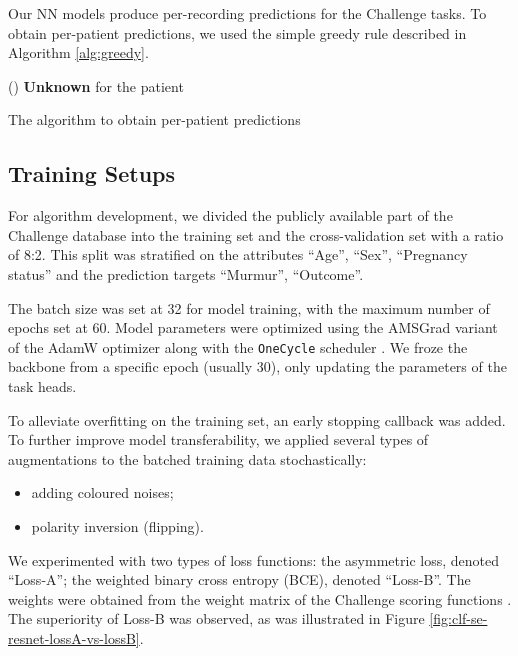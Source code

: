 Our NN models produce per-recording predictions for the Challenge tasks. To obtain per-patient predictions, we used the simple greedy rule described in Algorithm \ref{alg:greedy}.

\begin{algorithm}
\SetInd{0.2em}{2em}
\Else(){
    \textbf{Unknown} for the patient\;
}
\caption{The algorithm to obtain per-patient predictions}\label{alg:greedy}
\end{algorithm}

\subsection{Training Setups}
\label{subsec:training}

For algorithm development, we divided the publicly available part of the Challenge database into the training set and the cross-validation set with a ratio of 8:2. This split was stratified on the attributes ``Age'', ``Sex'', ``Pregnancy status'' and the prediction targets ``Murmur'', ``Outcome''.

The batch size was set at 32 for model training, with the maximum number of epochs set at 60. Model parameters were optimized using the AMSGrad variant of the AdamW optimizer \cite{adamw_amsgrad} along with the \texttt{OneCycle} scheduler \cite{smith2019one_cycle}. We froze the backbone from a specific epoch (usually 30), only updating the parameters of the task heads.

To alleviate overfitting on the training set, an early stopping callback was added. To further improve model transferability, we applied several types of augmentations to the batched training data stochastically:
\begin{itemize}
    \item adding coloured noises;
    \item polarity inversion (flipping).
\end{itemize}

We experimented with two types of loss functions: the asymmetric loss, denoted ``Loss-A''; the weighted binary cross entropy (BCE), denoted ``Loss-B''. The weights were obtained from the weight matrix of the Challenge scoring functions \cite{cinc2022}. The superiority of Loss-B was observed, as was illustrated in Figure \ref{fig:clf-se-resnet-lossA-vs-lossB}.

